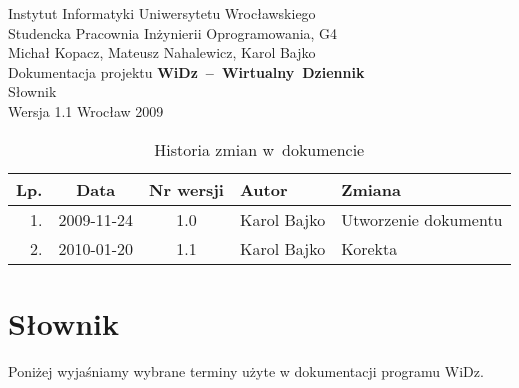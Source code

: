 \documentclass[12pt,leqno,twoside]{mwart}
\begin{document}
\begin{titlepage}
\begin{center}
Instytut Informatyki Uniwersytetu Wrocławskiego \\
Studencka Pracownia Inżynierii Oprogramowania, G4 \\
\vspace{4cm}
\Large Michał Kopacz, Mateusz Nahalewicz, Karol Bajko \\
\vspace{0.5cm}
\huge Dokumentacja projektu \mbox{\textbf{WiDz -- Wirtualny Dziennik}} \\ \Large Słownik\\
\vspace{1cm}
\normalsize Wersja 1.1
\vfill
\normalsize Wrocław 2009
\end{center}
\end{titlepage}

\newpage

\begin{table}
	\centering
	\caption{Historia zmian w~dokumencie}
		\begin{tabular}{|r|c|c|l|l|}
		\hline
		Lp. 	& Data       & Nr wersji 	& Autor           		& Zmiana \\ \hline
		1.   	& 2009-11-24 & 1.0       	& Karol Bajko & Utworzenie dokumentu \\ \hline
		2.   	& 2010-01-20 & 1.1       	& Karol Bajko & Korekta \\ \hline
		\end{tabular}
\end{table}

\section{Słownik}
\noindent Poniżej wyjaśniamy wybrane terminy użyte w dokumentacji programu WiDz.
\end{document}
